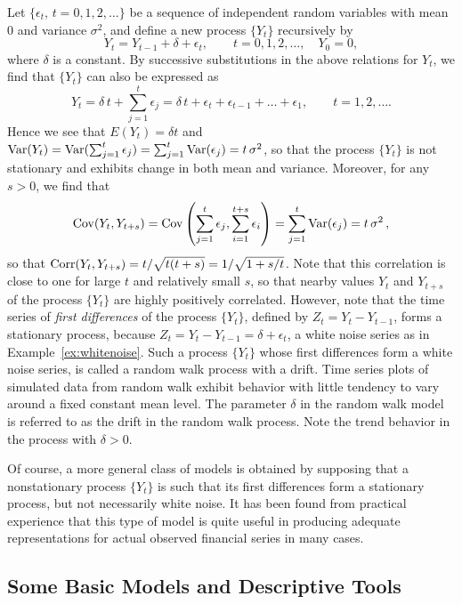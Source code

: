 \begin{ex} \label{ex:driftwalk} Let $\{\epsilon_t, \, t=0,1,2, \ldots\}$ be a sequence of independent random variables with mean 0 and variance $\sigma^2$, and define a new process $\{Y_t\}$ recursively by
	\[
	Y_t = Y_{t-1} + \delta + \epsilon_t, \qquad t=0,1,2, \ldots, \quad Y_0 = 0,
	\]
where $\delta$ is a constant.  By successive substitutions in the above relations for $Y_t$, we find that $\{Y_t\}$ can also be expressed as
	\[
	Y_t = \delta \, t + \sum_{j=1}^t \epsilon_j= \delta \, t + \epsilon_{t} + \epsilon_{t-1} + \ldots + \epsilon_{1}, \qquad t=1,2, \ldots .
	\]
Hence we see that $E(Y_t)=\delta t$ and $\operatorname{Var}(Y_t)= \operatorname{Var}(\sum_{j=1}^t \epsilon_j)= \sum_{j=1}^t\operatorname{Var}(\epsilon_j)=t \, \sigma^2$, so that the process $\{Y_t\}$ is not stationary and exhibits change in both mean and variance.  Moreover, for any $s>0$, we find that
	\[
	\operatorname{Cov}(Y_t,Y_{t+s})= \operatorname{Cov}\left(\sum_{j=1}^t \epsilon_j, \sum_{i=1}^{t+s} \epsilon_i\right)= \sum_{j=1}^t\text{Var}(\epsilon_j)= t \, \sigma^2 \, ,
	\]
so that $\operatorname{Corr}(Y_t,Y_{t+s}) = t / \sqrt{t(t+s)} = 1/ \sqrt{1+s/t}$. Note that this correlation is close to one for large $t$ and relatively small $s$, so that nearby values $Y_t$ and $Y_{t+s}$ of the process $\{Y_t\}$ are highly positively correlated.  However, note that the time series of \textit{first differences} of the process $\{Y_t\}$, defined by $Z_{t}=Y_{t}-Y_{t-1}$, forms a stationary process, because $Z_{t}=Y_{t}-Y_{t-1} = \delta + \epsilon_t$, a white noise series as in Example~\ref{ex:whitenoise}. Such a process $\{Y_t\}$ whose first differences form a white noise series, is called a random walk process with a drift. Time series plots of simulated data from random walk exhibit behavior with little tendency to vary around a fixed constant mean level. The parameter $\delta$ in the random walk model is referred to as the drift in the random walk process. Note the trend behavior in the process with $\delta>0$.
\end{ex}


Of course, a more general class of models is obtained by supposing that a nonstationary process $\{Y_t\}$ is such that its first differences form a stationary process, but not necessarily white noise.  It has been found from practical experience that this type of model is quite useful in producing adequate representations for actual observed financial series in many cases.


\subsection{Some Basic Models and Descriptive Tools} \hfill


